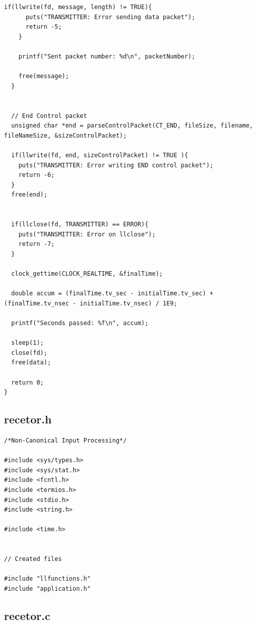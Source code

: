 \documentclass[11pt]{article}
\begin{document}
\begin{lstlisting}[style=CStyle]
    if(llwrite(fd, message, length) != TRUE){
      puts("TRANSMITTER: Error sending data packet");
      return -5;
    }

    printf("Sent packet number: %d\n", packetNumber);

    free(message);
  }


  // End Control packet
  unsigned char *end = parseControlPacket(CT_END, fileSize, filename, fileNameSize, &sizeControlPacket);

  if(llwrite(fd, end, sizeControlPacket) != TRUE ){
    puts("TRANSMITTER: Error writing END control packet");
    return -6;
  }
  free(end);


  if(llclose(fd, TRANSMITTER) == ERROR){
    puts("TRANSMITTER: Error on llclose");
    return -7;
  }

  clock_gettime(CLOCK_REALTIME, &finalTime);

  double accum = (finalTime.tv_sec - initialTime.tv_sec) + (finalTime.tv_nsec - initialTime.tv_nsec) / 1E9;

  printf("Seconds passed: %f\n", accum);

  sleep(1);
  close(fd);
  free(data);

  return 0;
}
\end{lstlisting}

\pagebreak

\subsection{recetor.h}

\begin{lstlisting}[style=CStyle]
/*Non-Canonical Input Processing*/

#include <sys/types.h>
#include <sys/stat.h>
#include <fcntl.h>
#include <termios.h>
#include <stdio.h>
#include <string.h>

#include <time.h>


// Created files

#include "llfunctions.h"
#include "application.h"
\end{lstlisting}

\pagebreak

\subsection{recetor.c}
\end{document}
